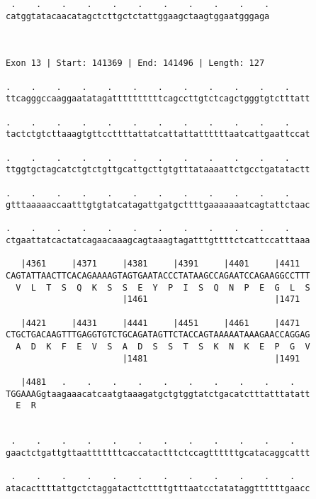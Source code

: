 \documentclass{article}
\begin{document}
\begin{Verbatim}
 .    .    .    .    .    .    .    .    .    .    .
catggtatacaacatagctcttgctctattggaagctaagtggaatgggaga
                                                    
                                                    
 
Exon 13 | Start: 141369 | End: 141496 | Length: 127
 
.    .    .    .    .    .    .    .    .    .    .    .    
ttcagggccaaggaatatagattttttttttcagccttgtctcagctgggtgtctttatt
                                                            
.    .    .    .    .    .    .    .    .    .    .    .    
tactctgtcttaaagtgttccttttattatcattattattttttaatcattgaattccat
                                                            
.    .    .    .    .    .    .    .    .    .    .    .    
ttggtgctagcatctgtctgttgcattgcttgtgtttataaaattctgcctgatatactt
                                                            
.    .    .    .    .    .    .    .    .    .    .    .    
gtttaaaaaccaatttgtgtatcatagattgatgcttttgaaaaaaatcagtattctaac
                                                            
.    .    .    .    .    .    .    .    .    .    .    .    
ctgaattatcactatcagaacaaagcagtaaagtagatttgttttctcattccatttaaa
                                                            
   |4361     |4371     |4381     |4391     |4401     |4411  
CAGTATTAACTTCACAGAAAAGTAGTGAATACCCTATAAGCCAGAATCCAGAAGGCCTTT
  V  L  T  S  Q  K  S  S  E  Y  P  I  S  Q  N  P  E  G  L  S
                       |1461                         |1471  
  
   |4421     |4431     |4441     |4451     |4461     |4471  
CTGCTGACAAGTTTGAGGTGTCTGCAGATAGTTCTACCAGTAAAAATAAAGAACCAGGAG
  A  D  K  F  E  V  S  A  D  S  S  T  S  K  N  K  E  P  G  V
                       |1481                         |1491  
  
   |4481   .    .    .    .    .    .    .    .    .    .   
TGGAAAGgtaagaaacatcaatgtaaagatgctgtggtatctgacatctttatttatatt
  E  R                                                      
                                                            
  
 .    .    .    .    .    .    .    .    .    .    .    .   
gaactctgattgttaatttttttcaccatactttctccagttttttgcatacaggcattt
                                                            
 .    .    .    .    .    .    .    .    .    .    .    .   
atacacttttattgctctaggatacttcttttgtttaatcctatataggttttttgaacc
                                                            

\end{Verbatim}
\end{document}
